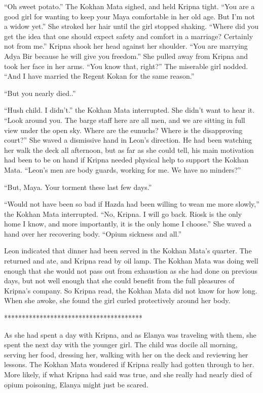 \documentclass{article}
\begin{document}
	“Oh sweet potato.” The Kokhan Mata sighed, and held Kripna tight. “You are a good girl for wanting to keep your Maya comfortable in her old age. But I’m not a widow yet.” She stroked her hair until the girl stopped shaking. “Where did you get the idea that one should expect safety and comfort in a marriage? Certainly not from me.” Kripna shook her head against her shoulder. “You are marrying Adya Bir because he will give you freedom.” She pulled away from Kripna and took her face in her arms. “You know that, right?” The miserable girl nodded. “And I have married the Regent Kokan for the same reason.” 
	
	“But you nearly died..” 
	
	“Hush child. I didn’t.” the Kokhan Mata interrupted. She didn’t want to hear it. “Look around you. The barge staff here are all men, and we are sitting in full view under the open sky. Where are the eunuchs? Where is the disapproving court?” She waved a dismissive hand in Leon’s direction. He had been watching her walk the deck all afternoon, but as far as she could tell, his main motivation had been to be on hand if Kripna needed physical help to support the Kokhan Mata. “Leon’s men are body guards, working for me. We have no minders?” 
	
	“But, Maya. Your torment these last few days.” 
	
	“Would not have been so bad if Hazda had been willing to wean me more slowly,” the Kokhan Mata interrupted. “No, Kripna. I will go back. Riosk is the only home I know, and more importantly, it is the only home I choose.” She waved a hand over her recovering body. “Opium sickness and all.”
	
	Leon indicated that dinner had been served in the Kokhan Mata’s quarter. The returned and ate, and Kripna read by oil lamp. The Kokhan Mata was doing well enough that she would not pass out from exhaustion as she had done on previous days, but not well enough that she could benefit from the full pleasures of Kripna’s company. So Kripna read, the Kokhan Mata did not know for how long. When she awoke, she found the girl curled protectively around her body.
	
	***************************************
	
	As she had spent a day with Kripna, and as Elanya was traveling with them, she spent the next day with the younger girl. The child was docile all morning, serving her food, dressing her, walking with her on the deck and reviewing her lessons. The Kokhan Mata wondered if Kripna really had gotten through to her. More likely, if what Kripna had said was true, and she really had nearly died of opium poisoning, Elanya might just be scared.
	
\end{document}
